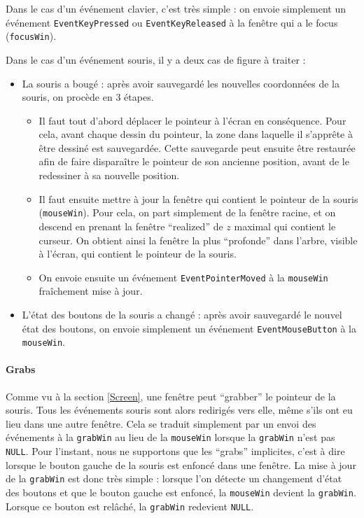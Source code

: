 Dans le cas d'un événement clavier, c'est très simple : on envoie simplement un événement \verb|EventKeyPressed| ou \verb|EventKeyReleased| à la fenêtre qui a le focus (\verb|focusWin|).

Dans le cas d'un événement souris, il y a deux cas de figure à traiter :
\begin{itemize}
  \item La souris a bougé : après avoir sauvegardé les nouvelles coordonnées de la souris, on procède en 3 étapes.
    \begin{itemize}
      \item Il faut tout d'abord déplacer le pointeur à l'écran en conséquence. Pour cela, avant chaque dessin du pointeur, la zone dans laquelle il s'apprête à être dessiné est sauvegardée. Cette sauvegarde peut ensuite être restaurée afin de faire disparaître le pointeur de son ancienne position, avant de le redessiner à sa nouvelle position.
      \item Il faut ensuite mettre à jour la fenêtre qui contient le pointeur de la souris (\verb|mouseWin|). Pour cela, on part simplement de la fenêtre racine, et on descend en prenant la fenêtre ``realized'' de $z$ maximal qui contient le curseur. On obtient ainsi la fenêtre la plus ``profonde'' dans l'arbre, visible à l'écran, qui contient le pointeur de la souris.
      \item On envoie ensuite un événement \verb|EventPointerMoved| à la \verb|mouseWin| fraîchement mise à jour.
    \end{itemize}
  \item L'état des boutons de la souris a changé : après avoir sauvegardé le nouvel état des boutons, on envoie simplement un événement \verb|EventMouseButton| à la \verb|mouseWin|.
\end{itemize}

\paragraph{Grabs} Comme vu à la section \ref{Screen}, une fenêtre peut ``grabber'' le pointeur de la souris. Tous les événements souris sont alors redirigés vers elle, même s'ils ont eu lieu dans une autre fenêtre. Cela se traduit simplement par un envoi des événements à la \verb|grabWin| au lieu de la \verb|mouseWin| lorsque la \verb|grabWin| n'est pas \verb|NULL|. Pour l'instant, nous ne supportons que les ``grabs'' implicites, c'est à dire lorsque le bouton gauche de la souris est enfoncé dans une fenêtre. La mise à jour de la \verb|grabWin| est donc très simple : lorsque l'on détecte un changement d'état des boutons et que le bouton gauche est enfoncé, la \verb|mouseWin| devient la \verb|grabWin|. Lorsque ce bouton est relâché, la \verb|grabWin| redevient \verb|NULL|.

